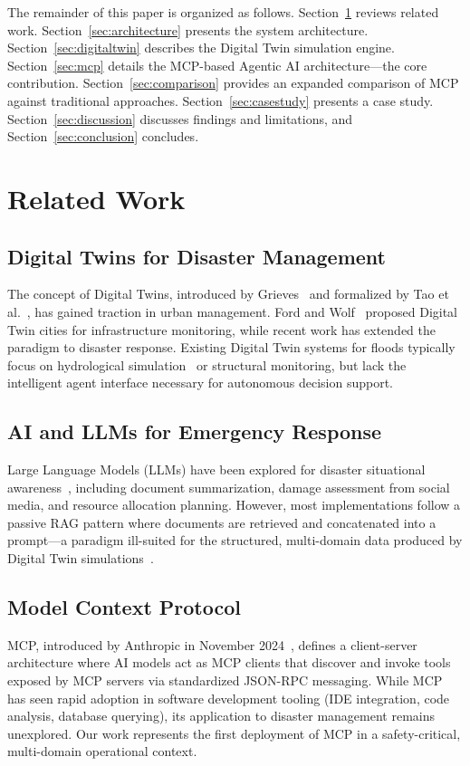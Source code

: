 \documentclass[journal]{IEEEtran}
\begin{document}
The remainder of this paper is organized as follows. Section~\ref{sec:related}
reviews related work. Section~\ref{sec:architecture} presents the system
architecture. Section~\ref{sec:digitaltwin} describes the Digital Twin
simulation engine. Section~\ref{sec:mcp} details the MCP-based Agentic AI
architecture---the core contribution. Section~\ref{sec:comparison} provides
an expanded comparison of MCP against traditional approaches.
Section~\ref{sec:casestudy} presents a case study.
Section~\ref{sec:discussion} discusses findings and limitations, and
Section~\ref{sec:conclusion} concludes.


\section{Related Work}
\label{sec:related}

\subsection{Digital Twins for Disaster Management}
The concept of Digital Twins, introduced by Grieves~\cite{grieves2014digital}
and formalized by Tao et al.~\cite{tao2019digital}, has gained traction in
urban management. Ford and Wolf~\cite{ford2016smart} proposed Digital Twin
cities for infrastructure monitoring, while recent work has extended the
paradigm to disaster response. Existing Digital Twin systems for floods
typically focus on hydrological simulation~\cite{wing2017flood} or structural
monitoring, but lack the intelligent agent interface necessary for autonomous
decision support.

\subsection{AI and LLMs for Emergency Response}
Large Language Models (LLMs) have been explored for disaster situational
awareness~\cite{google2024gemini}, including document summarization,
damage assessment from social media, and resource allocation planning.
However, most implementations follow a passive RAG pattern where documents
are retrieved and concatenated into a prompt---a paradigm ill-suited for
the structured, multi-domain data produced by Digital Twin
simulations~\cite{lewis2020rag}.

\subsection{Model Context Protocol}
MCP, introduced by Anthropic in November 2024~\cite{anthropic2024mcp},
defines a client-server architecture where AI models act as MCP clients
that discover and invoke tools exposed by MCP servers via standardized
JSON-RPC messaging. While MCP has seen rapid adoption in software
development tooling (IDE integration, code analysis, database querying),
its application to disaster management remains unexplored. Our work
represents the first deployment of MCP in a safety-critical, multi-domain
operational context.
\end{document}
